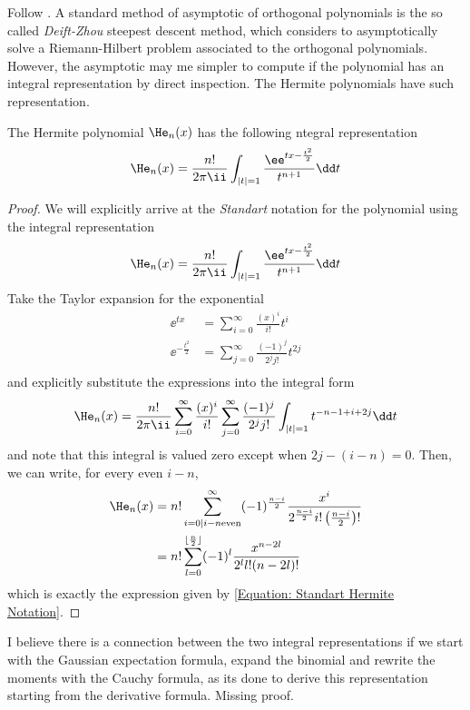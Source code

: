 
Follow \cite[Proposition 2.1]{Zhipeng-Liu-ClassNotes}. A standard method of asymptotic of orthogonal polynomials is the so called \textit{Deift-Zhou} steepest descent method, which considers to asymptotically solve a Riemann-Hilbert problem associated to the orthogonal polynomials. However, the asymptotic may me simpler to compute if the polynomial has an integral representation by direct inspection. The Hermite polynomials have such representation.

\begin{prop}
	The Hermite polynomial $\He_{n}(x)$ has the following ntegral representation
	\begin{equation}
		\He_{n}(x) = \frac{n!}{2\pi\ii} \int_{|t| = 1} \frac{\ee^{tx - \frac{t^2}{2}}}{t^{n+1}} \dd t
	\end{equation}
	\label{Prop: Hermite Integral Representation}
\end{prop}
\begin{proof}
	We will explicitly arrive at the \textit{Standart} notation for the polynomial using the integral representation
	\begin{equation}
		\He_{n}(x) = \frac{n!}{2\pi\ii} \int_{|t| = 1} \frac{\ee^{tx - \frac{t^2}{2}}}{t^{n+1}} \dd t
	\end{equation}
	Take the Taylor expansion for the exponential
	\begin{align}
		\ee^{tx} & = \sum_{i=0}^{\infty} \frac{(x)^i}{i!} t^i \\
		\ee^{-\frac{t^2}{2}} & = \sum_{j=0}^{\infty} \frac{(-1)^j}{2^j j!} t^{2j}\\
	\end{align}
	and explicitly substitute the expressions into the integral form
	\begin{equation}
		\He_{n}(x) = \frac{n!}{2\pi\ii} \sum_{i=0}^{\infty} \frac{(x)^i}{i!} \sum_{j=0}^{\infty} \frac{(-1)^j}{2^j j!} \int_{|t| = 1} t^{-n-1+i+2j} \dd t
	\end{equation}
	and note that this integral is valued zero except when $2j - (i-n) = 0$. Then, we can write, for every even $i-n$,
	\begin{align}
		\He_n(x) & = n! \sum_{i=0|i-n\text{even}}^{\infty} (-1)^{\frac{n-i}{2}} \frac{x^i}{2^{\frac{n-i}{2}} i! \left( \frac{n-i}{2} \right)!} \\
		& = n! \sum_{l=0}^{\lfloor \frac{n}{2} \rfloor} (-1)^{l} \frac{x^{n-2l}}{2^l l! (n-2l)!}
	\end{align}
	which is exactly the expression given by \ref{Equation: Standart Hermite Notation}.
\end{proof}

\begin{prop}
	I believe there is a connection between the two integral representations if we start with the Gaussian expectation formula, expand the binomial and rewrite the moments with the Cauchy formula, as its done to derive this representation starting from the derivative formula. Missing proof. 
\end{prop}
